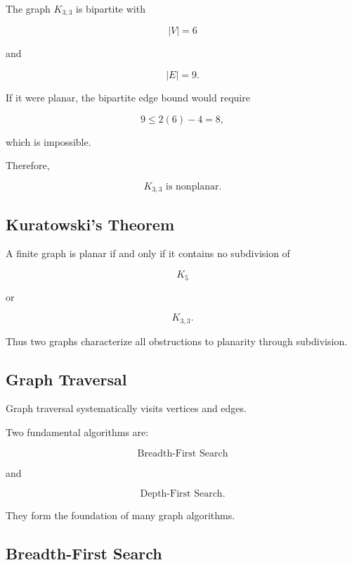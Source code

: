 The graph \(K_{3,3}\) is bipartite with

\[
|V|=6
\]

and

\[
|E|=9.
\]

If it were planar, the bipartite edge bound would require

\[
9\leq2(6)-4=8,
\]

which is impossible.

Therefore,

\[
\boxed{
K_{3,3}\text{ is nonplanar}.
}
\]

\subsection{Kuratowski's Theorem}
\label{subsec:kuratowskis-theorem}

\begin{theorem}
A finite graph is planar if and only if it contains no subdivision of

\[
\boxed{
K_5
}
\]

or

\[
\boxed{
K_{3,3}.
}
\]
\end{theorem}

Thus two graphs characterize all obstructions to planarity through
subdivision.

\subsection{Graph Traversal}
\label{subsec:graph-traversal}

Graph traversal systematically visits vertices and edges.

Two fundamental algorithms are:

\[
\boxed{
\text{Breadth-First Search}
}
\]

and

\[
\boxed{
\text{Depth-First Search}.
}
\]

They form the foundation of many graph algorithms.

\subsection{Breadth-First Search}
\label{subsec:breadth-first-search}

